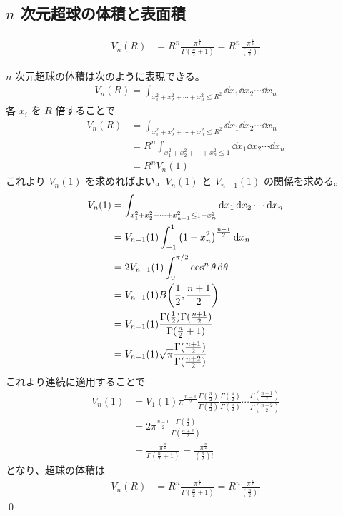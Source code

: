 \documentclass[uplatex,dvipdfmx,a4paper,11pt]{jlreq}
\makeatletter
\theoremstyle{definition}
\renewenvironment{proof}[1][\proofname]{\par
  \normalfont
  \topsep6\p@\@plus6\p@ \trivlist
  \item[\hskip\labelsep{\bfseries #1}\@addpunct{\bfseries}]\ignorespaces\quad\par
}{%
  \qed\endtrivlist\@endpefalse
}
\renewcommand\proofname{証明}
\makeatother
\begin{document}
\subsection{$n$ 次元超球の体積と表面積}
\begin{theorem}
  \begin{align}
    V_n(R) & = R^n\frac{\pi^{\frac{n}{2}}}{\Gamma(\frac{n}{2}+1)} = R^n\frac{\pi^{\frac{n}{2}}}{(\frac{n}{2})!}
  \end{align}
\end{theorem}
\begin{proof}
  $n$ 次元超球の体積は次のように表現できる。
  \begin{align}
    V_n(R) = \int_{x_1^2 + x_2^2 + \cdots + x_n^2\leq R^2}\dd{x_1}\dd{x_2}\cdots\dd{x_n}
  \end{align}
  各 $x_i$ を $R$ 倍することで
  \begin{align}
    V_n(R) & = \int_{x_1^2 + x_2^2 + \cdots + x_n^2\leq R^2}\dd{x_1}\dd{x_2}\cdots\dd{x_n}  \\
           & = R^n\int_{x_1^2 + x_2^2 + \cdots + x_n^2\leq 1}\dd{x_1}\dd{x_2}\cdots\dd{x_n} \\
           & = R^nV_n(1)
  \end{align}
  これより $V_n(1)$ を求めればよい。$V_n(1)$ と $V_{n-1}(1)$ の関係を求める。
  \begin{align}
    V_n(1) & = \int_{x_1^2 + x_2^2 + \cdots + x_{n-1}^2\leq 1 - x_n^2}\dd{x_1}\dd{x_2}\cdots\dd{x_n} \\
           & = V_{n-1}(1)\int_{-1}^1\qty(1 - x_n^2)^{\frac{n-1}{2}}\dd{x_n}                          \\
           & = 2V_{n-1}(1)\int_0^{\pi/2}\cos^{n}\theta\dd{\theta}                                    \\
           & = V_{n-1}(1)B\qty(\frac{1}{2}, \frac{n+1}{2})                                           \\
           & = V_{n-1}(1)\frac{\Gamma(\frac{1}{2})\Gamma(\frac{n+1}{2})}{\Gamma(\frac{n}{2}+1)}      \\
           & = V_{n-1}(1)\sqrt{\pi}\frac{\Gamma(\frac{n+1}{2})}{\Gamma(\frac{n+2}{2})}
  \end{align}
  これより連続に適用することで
  \begin{align}
    V_n(1) & = V_{1}(1)\pi^{\frac{n-1}{2}}\frac{\Gamma(\frac{3}{2})}{\Gamma(\frac{4}{2})}\frac{\Gamma(\frac{4}{2})}{\Gamma(\frac{5}{2})}\cdots\frac{\Gamma(\frac{n+1}{2})}{\Gamma(\frac{n+2}{2})} \\
           & = 2\pi^{\frac{n-1}{2}}\frac{\Gamma(\frac{3}{2})}{\Gamma(\frac{n+2}{2})}                                                                                                              \\
           & = \frac{\pi^{\frac{n}{2}}}{\Gamma(\frac{n}{2}+1)} = \frac{\pi^{\frac{n}{2}}}{(\frac{n}{2})!}
  \end{align}
  となり、超球の体積は
  \begin{align}
    V_n(R) & = R^n\frac{\pi^{\frac{n}{2}}}{\Gamma(\frac{n}{2}+1)} = R^n\frac{\pi^{\frac{n}{2}}}{(\frac{n}{2})!}
  \end{align}
\end{proof}
\end{document}
